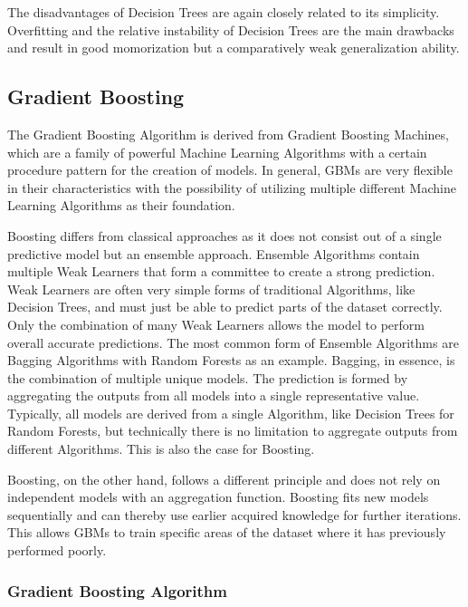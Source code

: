 The disadvantages of Decision Trees are again closely related to its simplicity. Overfitting and 
the relative instability of Decision Trees are the main drawbacks and result in good momorization 
but a comparatively weak generalization ability.

\subsection{Gradient Boosting}

The Gradient Boosting Algorithm is derived from Gradient Boosting Machines, which are a family of 
powerful Machine Learning Algorithms with a certain procedure pattern for the creation of models. 
In general, GBMs are very flexible in their characteristics with the possibility of utilizing 
multiple different Machine Learning Algorithms as their foundation.

Boosting differs from classical approaches as it does not consist out of a single predictive 
model but an ensemble approach. Ensemble Algorithms contain multiple Weak Learners that form a 
committee to create a strong prediction. Weak Learners are often very simple forms of traditional 
Algorithms, like Decision Trees, and must just be able to predict parts of the dataset correctly. 
Only the combination of many Weak Learners allows the model to perform overall accurate 
predictions. The most common form of Ensemble Algorithms are Bagging Algorithms with Random 
Forests as an example. Bagging, in essence, is the combination of multiple unique models. The 
prediction is formed by aggregating the outputs from all models into a single representative 
value. Typically, all models are derived from a single Algorithm, like Decision Trees for Random 
Forests, but technically there is no limitation to aggregate outputs from different Algorithms. 
This is also the case for Boosting. 

Boosting, on the other hand, follows a different principle and does not rely on independent 
models with an aggregation function. Boosting fits new models sequentially and can thereby use 
earlier acquired knowledge for further iterations. This allows GBMs to train specific areas of 
the dataset where it has previously performed poorly.  

\subsubsection{Gradient Boosting Algorithm}
\label{sec:Gradient Boosting Algorithm}


